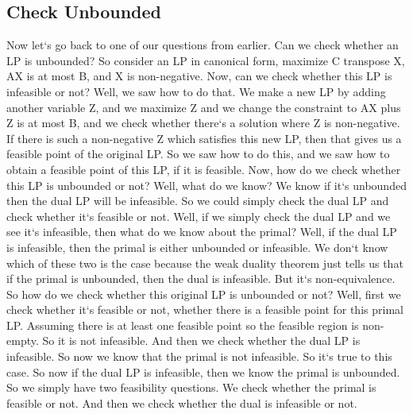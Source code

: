 \subsection{Check Unbounded}
Now let`s go back to one of our questions from earlier.
Can we check whether an LP is unbounded? So consider an LP in canonical form, maximize C transpose X, AX is at most B, and X is non-negative.
Now, can we check whether this LP is infeasible or not? Well, we saw how to do that.
We make a new LP by adding another variable Z, and we maximize Z and we change the constraint to AX plus Z is at most B, and we check whether there`s a solution where Z is non-negative.
If there is such a non-negative Z which satisfies this new LP, then that gives us a feasible point of the original LP\@.
So we saw how to do this, and we saw how to obtain a feasible point of this LP, if it is feasible.
Now, how do we check whether this LP is unbounded or not? Well, what do we know? We know if it`s unbounded then the dual LP will be infeasible.
So we could simply check the dual LP and check whether it`s feasible or not.
Well, if we simply check the dual LP and we see it`s infeasible, then what do we know about the primal? Well, if the dual LP is infeasible, then the primal is either unbounded or infeasible.
We don`t know which of these two is the case because the weak duality theorem just tells us that if the primal is unbounded, then the dual is infeasible.
But it`s non-equivalence.
So how do we check whether this original LP is unbounded or not? Well, first we check whether it`s feasible or not, whether there is a feasible point for this primal LP\@.
Assuming there is at least one feasible point so the feasible region is non-empty.
So it is not infeasible.
And then we check whether the dual LP is infeasible.
So now we know that the primal is not infeasible.
So it`s true to this case.
So now if the dual LP is infeasible, then we know the primal is unbounded.
So we simply have two feasibility questions.
We check whether the primal is feasible or not.
And then we check whether the dual is infeasible or not.

